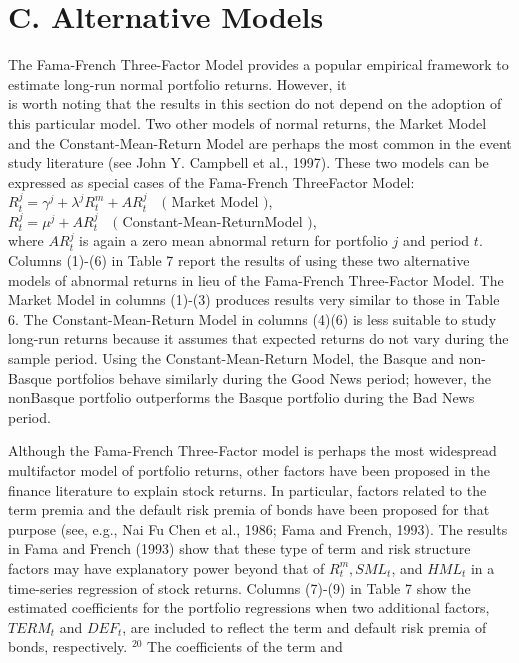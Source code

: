 \documentclass[10pt]{article}
\begin{document}
\section*{C. Alternative Models}
The Fama-French Three-Factor Model provides a popular empirical framework to estimate long-run normal portfolio returns. However, it\\
is worth noting that the results in this section do not depend on the adoption of this particular model. Two other models of normal returns, the Market Model and the Constant-Mean-Return Model are perhaps the most common in the event study literature (see John Y. Campbell et al., 1997). These two models can be expressed as special cases of the Fama-French ThreeFactor Model:\\
$R_{t}^{j}=\gamma^{j}+\lambda^{j} R_{t}^{m}+A R_{t}^{j} \quad($ Market Model $)$,\\
$R_{t}^{j}=\mu^{j}+A R_{t}^{j} \quad($ Constant-Mean-ReturnModel $)$,\\
where $A R_{t}^{j}$ is again a zero mean abnormal return for portfolio $j$ and period $t$. Columns (1)-(6) in Table 7 report the results of using these two alternative models of abnormal returns in lieu of the Fama-French Three-Factor Model. The Market Model in columns (1)-(3) produces results very similar to those in Table 6. The Constant-Mean-Return Model in columns (4)(6) is less suitable to study long-run returns because it assumes that expected returns do not vary during the sample period. Using the Constant-Mean-Return Model, the Basque and non-Basque portfolios behave similarly during the Good News period; however, the nonBasque portfolio outperforms the Basque portfolio during the Bad News period.

Although the Fama-French Three-Factor model is perhaps the most widespread multifactor model of portfolio returns, other factors have been proposed in the finance literature to explain stock returns. In particular, factors related to the term premia and the default risk premia of bonds have been proposed for that purpose (see, e.g., Nai Fu Chen et al., 1986; Fama and French, 1993). The results in Fama and French (1993) show that these type of term and risk structure factors may have explanatory power beyond that of $R_{t}^{m}, S M L_{t}$, and $H M L_{t}$ in a time-series regression of stock returns. Columns (7)-(9) in Table 7 show the estimated coefficients for the portfolio regressions when two additional factors, $T E R M_{t}$ and $D E F_{t}$, are included to reflect the term and default risk premia of bonds, respectively. ${ }^{20}$ The coefficients of the term and
\end{document}

